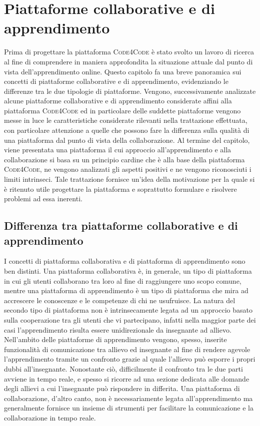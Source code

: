 \chapter{Piattaforme collaborative e di apprendimento} %
%
\begin{citazione}
Prima di progettare la piattaforma \textsc{Code4Code} è stato svolto un lavoro di ricerca al fine di comprendere in maniera approfondita la situazione attuale dal punto di vista dell'apprendimento online. Questo capitolo fa una breve panoramica sui concetti di piattaforme collaborative e di apprendimento, evidenziando le differenze tra le due tipologie di piattaforme. Vengono, successivamente analizzate alcune piattaforme collaborative e di apprendimento considerate affini alla piattaforma \textsc{Code4Code} ed in particolare delle suddette piattaforme vengono messe in luce le caratteristiche considerate rilevanti nella trattazione effettuata, con particolare attenzione a quelle che possono fare la differenza sulla qualità di una piattaforma dal punto di vista della collaborazione. Al termine del capitolo, viene presentata una piattaforma il cui approccio all'apprendimento e alla collaborazione si basa su un principio cardine che è alla base della piattaforma \textsc{Code4Code}, ne vengono analizzati gli aspetti positivi e ne vengono riconosciuti i limiti intrinseci. Tale trattazione fornisce un'idea della motivazione per la quale si è ritenuto utile progettare la piattaforma e soprattutto formulare e risolvere problemi ad essa inerenti.
\end{citazione}
\newpage

\section{Differenza tra piattaforme collaborative e di apprendimento} %
I concetti di piattaforma collaborativa e di piattaforma di apprendimento sono ben distinti. Una piattaforma collaborativa è, in generale, un tipo di piattaforma in cui gli utenti collaborano tra loro al fine di raggiungere uno scopo comune, mentre una piattaforma di apprendimento è un tipo di piattaforma che mira ad accrescere le conoscenze e le competenze di chi ne usufruisce. La natura del secondo tipo di piattaforma non è intrinsecamente legata ad un approccio basato sulla cooperazione tra gli utenti che vi partecipano, infatti nella maggior parte dei casi l'apprendimento risulta essere unidirezionale da insegnante ad allievo. Nell'ambito delle piattaforme di apprendimento vengono, spesso, inserite funzionalità di comunicazione tra allievo ed insegnante al fine di rendere agevole l'apprendimento tramite un confronto grazie al quale l'allievo può esporre i propri dubbi all'insegnante. Nonostante ciò, difficilmente il confronto tra le due parti avviene in tempo reale, e spesso si ricorre ad una sezione dedicata alle domande degli allievi a cui l'insegnante può rispondere in differita. Una piattaforma di collaborazione, d'altro canto, non è necessariamente legata all'apprendimento ma generalmente fornisce un insieme di strumenti per facilitare la comunicazione e la collaborazione in tempo reale.  
